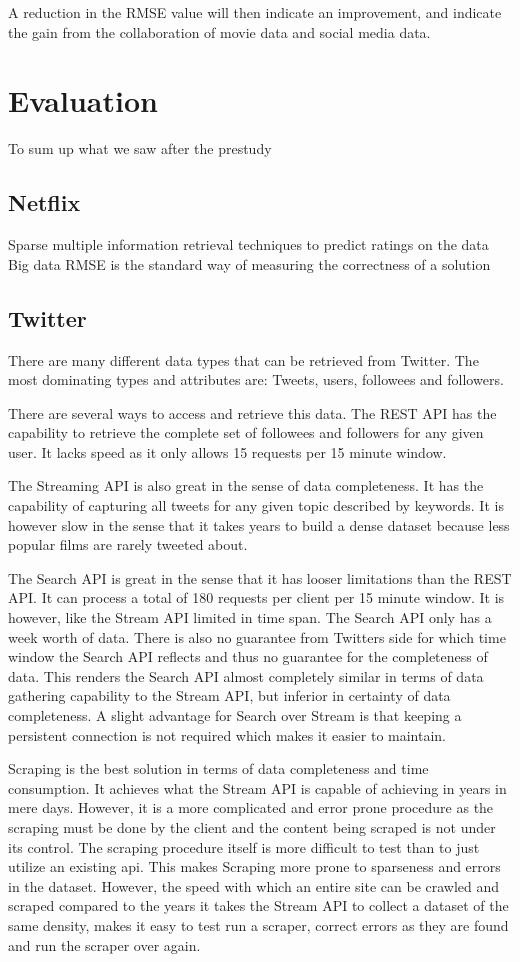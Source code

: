 A reduction in the RMSE value will then indicate an improvement, and indicate the gain from the collaboration of movie data and social media data.

\section{Evaluation}
To sum up what we saw after the prestudy

\subsection{Netflix}
Sparse
multiple information retrieval techniques to predict ratings on the data
Big data
RMSE is the standard way of measuring the correctness of a solution

\subsection{Twitter}
There are many different data types that can be retrieved from Twitter. The most dominating types and attributes are: Tweets, users, followees and followers.

There are several ways to access and retrieve this data. The REST API has the capability to retrieve the complete set of followees and followers for any given user. It lacks speed as it only allows 15 requests per 15 minute window.

The Streaming API is also great in the sense of data completeness. It has the capability of capturing all tweets for any given topic described by keywords. It is however slow in the sense that it takes years to build a dense dataset because less popular films are rarely tweeted about.

The Search API is great in the sense that it has looser limitations than the REST API. It can process a total of 180 requests per client per 15 minute window. It is however, like the Stream API limited in time span. The Search API only has a week worth of data. There is also no guarantee from Twitters side for which time window the Search API reflects and thus no guarantee for the completeness of data. This renders the Search API almost completely similar in terms of data gathering capability to the Stream API, but inferior in certainty of data completeness. A slight advantage for Search over Stream is that keeping a persistent connection is not required which makes it easier to maintain.

Scraping is the best solution in terms of data completeness and time consumption. It achieves what the Stream API is capable of achieving in years in mere days. However, it is a more complicated and error prone procedure as the scraping must be done by the client and the content being scraped is not under its control. The scraping procedure itself is more difficult to test than to just utilize an existing api. This makes Scraping more prone to sparseness and errors in the dataset. However, the speed with which an entire site can be crawled and scraped compared to the years it takes the Stream API to collect a dataset of the same density, makes it easy to test run a scraper, correct errors as they are found and run the scraper over again.

